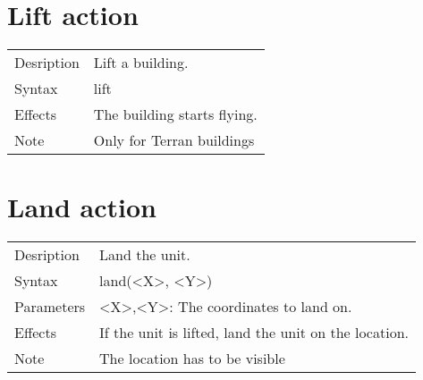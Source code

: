 \documentclass[english,11pt]{report}
\begin{document}
\section{Lift action}
\begin{tabularx}{\textwidth}{lX}
 Desription & Lift a building. \\
 Syntax & lift \\
 Effects &  The building starts flying.\\
 Note & Only for Terran buildings
\end{tabularx}

\section{Land action}
\begin{tabularx}{\textwidth}{lX}
 Desription & Land the unit. \\
 Syntax & land(<X>, <Y>) \\
 Parameters & <X>,<Y>: The coordinates to land on.\\
 Effects &  If the unit is lifted, land the unit on the location.\\
 Note & The location has to be visible
\end{tabularx}
\end{document}

